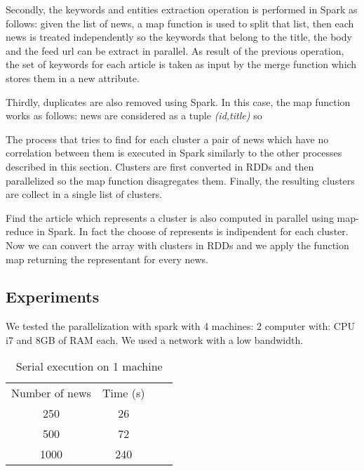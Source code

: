 \documentclass{acm_proc_article-sp}
\begin{document}

Secondly, the keywords and entities extraction operation is performed in Spark as follows: given the list of news, a map function is used to split that list, then each news is treated independently so the keywords that belong to the title, the body and the feed url can be extract in parallel. As result of the previous operation, the set of keywords for each article is taken as input by the merge function which stores them in a new attribute.

Thirdly, duplicates are also removed using Spark. In this case, the map function works as follows: news are considered as a tuple \textit{(id,title)} so

The process that tries to find for each cluster a pair of news which have no correlation between them is executed in Spark similarly to the other processes described in this section. Clusters are first converted in RDDs and then parallelized so the map function disagregates them. Finally, the resulting clusters are collect in a single list of clusters.

Find the article which represents a cluster is also computed in parallel using map-reduce in Spark. In fact the choose of represents is indipendent for each cluster. Now we can convert the array with clusters in RDDs and we apply the function map returning the representant for every news.

\subsection{Experiments}

We tested the parallelization with spark with 4 machines: 2 computer with: CPU i7 and 8GB of RAM each. We used a network with a low bandwidth.

\begin{table}[!ht]
\centering
\label{serial}
\begin{tabular}{cccc}
Number of news & Time (s) \\
250            & 26       \\
500            & 72       \\
1000           & 240      \\
\end{tabular}
\caption{Serial execution on 1 machine}
\end{table}
\end{document}
